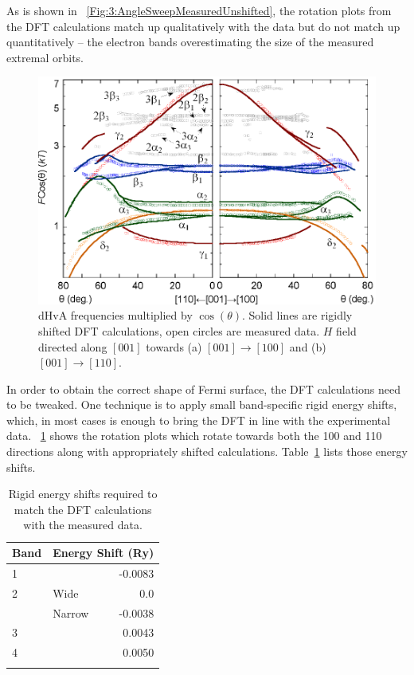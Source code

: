 As is shown in \fig~\ref{Fig:3:AngleSweepMeasuredUnshifted}, the rotation plots from the DFT calculations match up qualitatively with the data but do not match up quantitatively -- the electron bands overestimating the size of the measured extremal orbits. 

\begin{figure}[htbp]
    \begin{center}
        \includegraphics[scale=0.9]{Chapter3-dHvABaFe2P2/Figures/AngleDepMeasurements/AngleSweepRigidShift/AngleSweepRigidShift}
        \caption{dHvA frequencies multiplied by $\cos(\theta)$. Solid lines are rigidly shifted DFT calculations, open circles are measured data. $H$ field directed along $[001]$ towards (a) $[001]\rightarrow[100]$ and (b) $[001]\rightarrow[110]$.}
        \label{Fig:3:AngleSweepRigidShift}
    \end{center}
\end{figure}

In order to obtain the correct shape of Fermi surface, the DFT calculations need to be tweaked. One technique is to apply small band-specific rigid energy shifts, which, in most cases is enough to bring the DFT in line with the experimental data. \fig~\ref{Fig:3:AngleSweepRigidShift} shows the rotation plots which rotate towards both the 100 and 110 directions along with appropriately shifted calculations. Table~\ref{Table:3:EnergyShifts} lists those energy shifts.
\begin{table}
    \begin{center}
        \caption{Rigid energy shifts required to match the DFT calculations with the measured data.}
        \begin{tabular}[htbp]{llr}
\toprule
Band    & \multicolumn{2}{l}{Energy Shift (\unit{Ry})} \\
\midrule
1       &       & -0.0083      \\
2       & Wide  & 0.0          \\
        & Narrow & -0.0038     \\
3       &       & 0.0043       \\
4       &       & 0.0050        \\
\bottomrule
        \label{Table:3:EnergyShifts}
        \end{tabular}
    \end{center}
\end{table}

